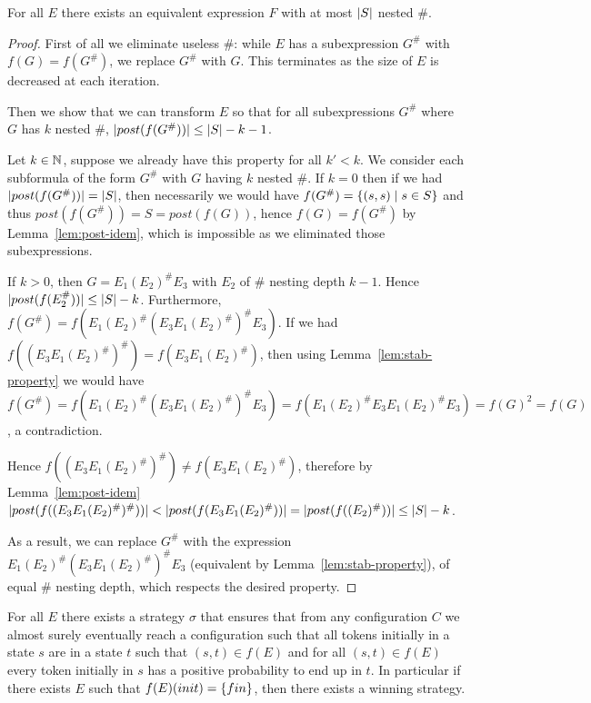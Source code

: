 \documentclass{article}
\begin{document}
\begin{lemma}
	\label{lem:small-depth}
	For all $E$ there exists an equivalent expression $F$ with at most $|S|$ nested $\#$.
\end{lemma}

\begin{proof}
	First of all we eliminate useless $\#$: while $E$ has a subexpression $G^\#$ with $f(G) = f(G^\#)$, we replace $G^\#$ with $G$. This terminates as the size of $E$ is decreased at each iteration.
	
	Then we show that we can transform $E$ so that for all subexpressions $G^\#$ where $G$ has $k$ nested $\#$, $|post(f(G^\#))| \leq |S| - k -1$.
	
	Let $k \in \mathbb{N}$, suppose we already have this property for all $k' < k$.
	We consider each subformula of the form $G^\#$ with $G$ having $k$ nested $\#$.
	If $k=0$ then if we had $|post(f(G^\#))| = |S|$, then necessarily we would have $f(G^\#) = \{ (s,s) \mid s \in S \}$ and thus $post(f(G^\#)) = S = post(f(G))$, hence $f(G) = f(G^\#)$ by Lemma~\ref{lem:post-idem}, which is impossible as we eliminated those subexpressions.
	
	If $k > 0$, then $G = E_1 (E_2)^\# E_3$ with $E_2$ of $\#$ nesting depth $k-1$. Hence $|post(f(E_2^\#))| \leq |S| - k$. 
	Furthermore, $f(G^\#) = f(E_1(E_2)^\# (E_3 E_1(E_2)^\#)^\# E_3)$. 
	If we had $f((E_3 E_1(E_2)^\#)^\#) = f(E_3 E_1(E_2)^\#)$, then using Lemma~\ref{lem:stab-property} we would have $f(G^\#) = f(E_1(E_2)^\# (E_3 E_1(E_2)^\#)^\# E_3) = f(E_1(E_2)^\# E_3 E_1(E_2)^\# E_3) = f(G)^2 = f(G)$, a contradiction.
	
	Hence $f((E_3 E_1(E_2)^\#)^\#) \neq f(E_3 E_1(E_2)^\#)$, therefore by Lemma~\ref{lem:post-idem} $|post(f((E_3 E_1(E_2)^\#)^\#))| < |post(f(E_3 E_1(E_2)^\#))| = |post(f((E_2)^\#))| \leq |S| -k$.
	
	As a result, we can replace $G^\#$ with the expression $E_1(E_2)^\# (E_3 E_1(E_2)^\#)^\# E_3$ (equivalent by Lemma~\ref{lem:stab-property}), of equal $\#$ nesting depth, which respects the desired property.
\end{proof}

\begin{lemma}
	\label{lem:exp-to-strat}
	For all $E$ there exists a strategy $\sigma$ that ensures that from any configuration $C$ we almost surely eventually reach a configuration such that
	all tokens initially in a state $s$ are in a state $t$ such that $(s,t) \in f(E)$ and
	for all $(s,t) \in f(E)$ every token initially in $s$ has a positive probability to end up in $t$.
	In particular if there exists $E$ such that $f(E)(init) =\{ fin \}$, then there exists a winning strategy.
\end{lemma}
\end{document}
